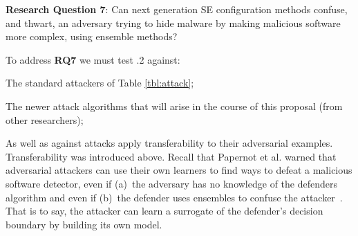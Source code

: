 \begin{blockquote}
\noindent
\textbf{Research Question 7}: 
Can next generation SE configuration methods   confuse, and thwart, an adversary trying to hide malware by making malicious software more complex, using ensemble methods?
 \end{blockquote} 
 
 To address {\bf RQ7} we must test {\IT}.2 against:
 \bi
 \item
 The standard attackers of
 Table \ref{tbl:attack};
 \item
 The newer attack algorithms that will arise in the course of this proposal (from other researchers);
 \item
 As well as against attacks apply transferability to their adversarial examples.
 \ei
Transferability was introduced above. Recall that Papernot et al. warned that adversarial  attackers can use their own learners to find ways to defeat a malicious software detector, even if (a)~the adversary has no knowledge of the defenders algorithm and  even if (b)~the defender uses ensembles to confuse the attacker~\cite{papernot2016transferability}.
   That is to say, the attacker can learn a surrogate of the defender's decision
   boundary by building its own model. 
   
 
